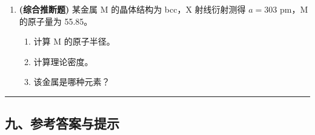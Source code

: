 \documentclass[a4paper,11pt]{ctexart}
\providecommand{\tightlist}{\setlength{\itemsep}{0pt}\setlength{\parskip}{0pt}}
\newcommand{\箭}{\ensuremath{\rightarrow}}
\newcommand{\左箭}{\ensuremath{\leftarrow}}
\newcommand{\上箭}{\ensuremath{\uparrow}}
\newcommand{\下箭}{\ensuremath{\downarrow}}
\newcommand{\衡}{\ensuremath{\rightleftharpoons}}
\newcommand{\双箭}{\ensuremath{\leftrightarrow}}
\newcommand{\约等于}{\ensuremath{\approx}}
\newcommand{\小于等于}{\ensuremath{\leq}}
\newcommand{\大于等于}{\ensuremath{\geq}}
\newcommand{\不等于}{\ensuremath{\neq}}
\newcommand{\西格马}{\ensuremath{\sigma}}
\newcommand{\派}{\ensuremath{\pi}}
\begin{document}
\begin{enumerate}
  \begin{enumerate}
  \def\labelenumii{(\alph{enumii})}
  \tightlist
  \item
    计算半径比。
  \item
    预测其可能的结构类型。
  \item
    若 A = Ti, B = O，画出晶胞示意并计算每个晶胞中的化学式单位数。
  \end{enumerate}
\item
  \textbf{(综合推断题)} 某金属 M 的晶体结构为 bcc，X 射线衍射测得 \(a = 303\) pm，M 的原子量为 55.85。

  \begin{enumerate}
  \def\labelenumii{(\alph{enumii})}
  \tightlist
  \item
    计算 M 的原子半径。
  \item
    计算理论密度。
  \item
    该金属是哪种元素？
  \end{enumerate}
\end{enumerate}

\begin{center}\rule{0.5\linewidth}{0.5pt}\end{center}

\subsection{九、参考答案与提示}\label{ux4e5dux53c2ux8003ux7b54ux6848ux4e0eux63d0ux793a}
\end{document}

